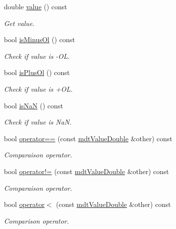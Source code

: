 \begin{DoxyCompactItemize}
double \hyperlink{classmdt_value_double_a41bf83b13cfe7d3779542652f62b8ad6}{value} () const 
\begin{DoxyCompactList}\small\item\em Get value. \end{DoxyCompactList}\item 
bool \hyperlink{classmdt_value_double_abfaf7fb87637880670e20f5581e69759}{is\-Minus\-Ol} () const 
\begin{DoxyCompactList}\small\item\em Check if value is -\/\-O\-L. \end{DoxyCompactList}\item 
bool \hyperlink{classmdt_value_double_a2dc24c548d44f9a6a81513f061f5fa70}{is\-Plus\-Ol} () const 
\begin{DoxyCompactList}\small\item\em Check if value is +\-O\-L. \end{DoxyCompactList}\item 
bool \hyperlink{classmdt_value_double_a07dec2c84cb5539793a79f847110b50f}{is\-Na\-N} () const 
\begin{DoxyCompactList}\small\item\em Check if value is Na\-N. \end{DoxyCompactList}\item 
bool \hyperlink{classmdt_value_double_a1ea11b964da46b14d557f65387146f27}{operator==} (const \hyperlink{classmdt_value_double}{mdt\-Value\-Double} \&other) const 
\begin{DoxyCompactList}\small\item\em Comparaison operator. \end{DoxyCompactList}\item 
bool \hyperlink{classmdt_value_double_aaf34f5ab6fd0f6aaf5bfd13e40b595c0}{operator!=} (const \hyperlink{classmdt_value_double}{mdt\-Value\-Double} \&other) const 
\begin{DoxyCompactList}\small\item\em Comparaison operator. \end{DoxyCompactList}\item 
bool \hyperlink{classmdt_value_double_a5539cdf87c9a6d86a2a2c61a5f043eb0}{operator$<$} (const \hyperlink{classmdt_value_double}{mdt\-Value\-Double} \&other) const 
\begin{DoxyCompactList}\small\item\em Comparison operator. \end{DoxyCompactList}\item 

\end{DoxyCompactItemize}

